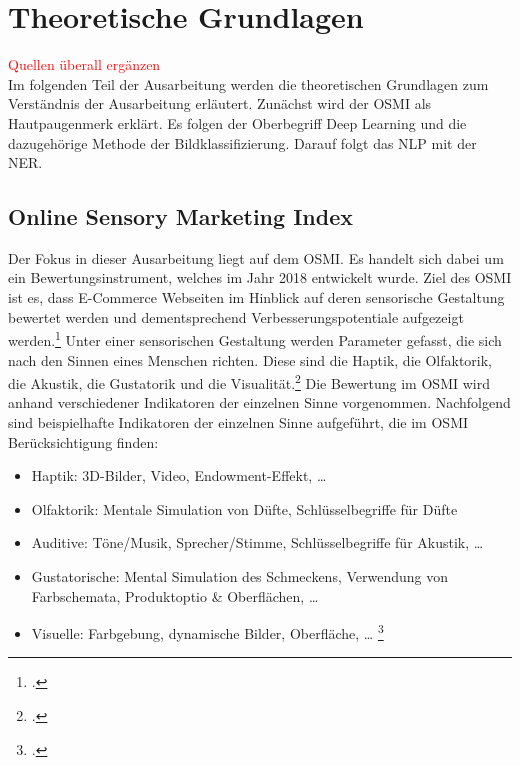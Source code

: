 \newpage
\section{Theoretische Grundlagen}
\textcolor{red}{Quellen überall ergänzen} \\
Im folgenden Teil der Ausarbeitung werden die theoretischen Grundlagen zum Verständnis der Ausarbeitung erläutert.
Zunächst wird der \ac{OSMI} als Hautpaugenmerk erklärt. Es folgen der Oberbegriff Deep Learning und die dazugehörige Methode der Bildklassifizierung.
Darauf folgt das \ac{NLP} mit der \ac{NER}.

\subsection{Online Sensory Marketing Index}

Der Fokus in dieser Ausarbeitung liegt auf dem \acl{OSMI}. Es handelt sich dabei um ein Bewertungsinstrument, welches im Jahr 2018 entwickelt wurde.
Ziel des \ac{OSMI} ist es, dass E-Commerce Webseiten im Hinblick auf deren sensorische Gestaltung bewertet werden und dementsprechend Verbesserungspotentiale aufgezeigt werden.\footcite[\vglf][]{hamacher2018}
Unter einer sensorischen Gestaltung werden Parameter gefasst, die sich nach den Sinnen eines Menschen richten. Diese sind die Haptik, die Olfaktorik, die Akustik, die Gustatorik und die Visualität.\footcite[\vglf][ & 862]{zou2018}
Die Bewertung im \ac{OSMI} wird anhand verschiedener Indikatoren der einzelnen Sinne vorgenommen. Nachfolgend sind beispielhafte Indikatoren der einzelnen Sinne aufgeführt, die im \ac{OSMI} Berücksichtigung finden:

\begin{itemize}
    \item Haptik: 3D-Bilder, Video, Endowment-Effekt, …
    \item Olfaktorik: Mentale Simulation von Düfte, Schlüsselbegriffe für Düfte
    \item Auditive: Töne/Musik, Sprecher/Stimme, Schlüsselbegriffe für Akustik, …
    \item Gustatorische: Mental Simulation des Schmeckens, Verwendung von
    Farbschemata, Produktoptio \& Oberflächen, …
    \item Visuelle: Farbgebung, dynamische Bilder, Oberfläche, … \footcite[\vglf][-56]{hamacher2018}
\end{itemize}

